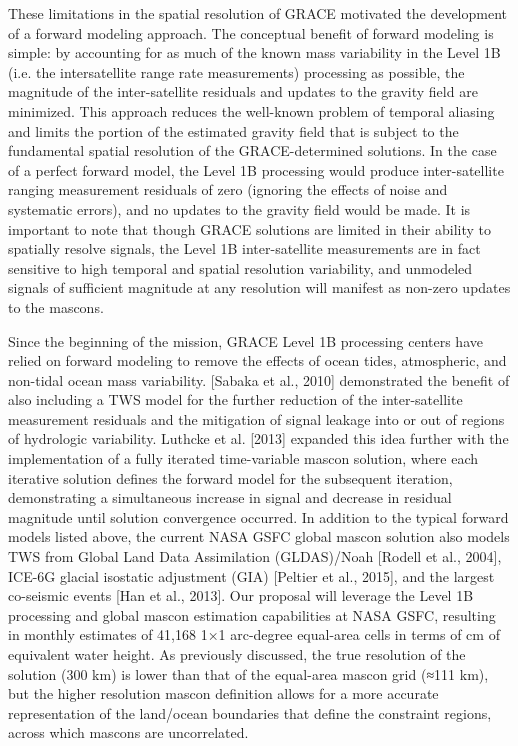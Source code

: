 \documentclass[review]{igs}
\begin{document}
These limitations in the spatial resolution of GRACE motivated the development of a forward modeling approach. The conceptual benefit of forward modeling is simple: by accounting for as much of the known mass variability in the Level 1B (i.e. the intersatellite range rate measurements) processing as possible, the magnitude of the inter-satellite residuals and updates to the gravity field are minimized. This approach reduces the well-known problem of temporal aliasing and limits the portion of the estimated gravity field that is subject to the fundamental spatial resolution of the GRACE-determined solutions. In the case of a perfect forward model, the Level 1B processing would produce inter-satellite ranging measurement residuals of zero (ignoring the effects of noise and systematic errors), and no updates to the gravity field would be made. It is important to note that though GRACE solutions are limited in their ability to spatially resolve signals, the Level 1B inter-satellite measurements are in fact sensitive to high temporal and spatial resolution variability, and unmodeled signals of sufficient magnitude at any resolution will manifest as non-zero updates to the mascons.

Since the beginning of the mission, GRACE Level 1B processing centers have relied on forward modeling to remove the effects of ocean tides, atmospheric, and non-tidal ocean mass variability. [Sabaka et al., 2010] demonstrated the benefit of also including a TWS model for the further reduction of the inter-satellite measurement residuals and the mitigation of signal leakage into or out of regions of hydrologic variability. Luthcke et al. [2013] expanded this idea further with the implementation of a fully iterated time-variable mascon solution, where each iterative solution defines the forward model for the subsequent iteration, demonstrating a simultaneous increase in signal and decrease in residual magnitude until solution convergence occurred. In addition to the typical forward models listed above, the current NASA GSFC global mascon solution also models TWS from Global Land Data Assimilation (GLDAS)/Noah [Rodell et al., 2004], ICE-6G glacial isostatic adjustment (GIA) [Peltier et al., 2015], and the largest co-seismic events [Han et al., 2013]. Our proposal will leverage the Level 1B processing and global mascon estimation capabilities at NASA GSFC, resulting in monthly estimates of 41,168 1×1 arc-degree equal-area cells in terms of cm of equivalent water height. As previously discussed, the true resolution of the solution (300 km) is lower than that of the equal-area mascon grid (≈111 km), but the higher resolution mascon definition allows for a more accurate representation of the land/ocean boundaries that define the constraint regions, across which mascons are
uncorrelated.
\end{document}
